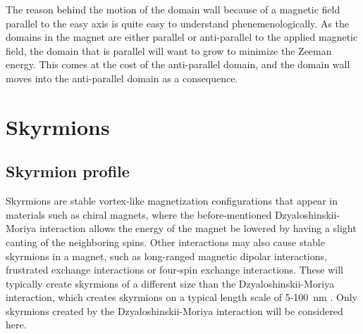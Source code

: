 \documentclass[12pt, a4paper, twoside, openright]{article}		%
\let\oldsection\section
\def\section{\cleardoublepage\oldsection}
\numberwithin{equation}{section}
\begin{document}
The reason behind the motion of the domain wall because of a magnetic field parallel to the easy axis is quite easy to understand phenemenologically. As the domains in the magnet are either parallel or anti-parallel to the applied magnetic field, the domain that is parallel will want to grow to minimize the Zeeman energy. This comes at the cost of the anti-parallel domain, and the domain wall moves into the anti-parallel domain as a consequence.

\section{Skyrmions} \label{sec:Skyrmions}
\subsection{Skyrmion profile} \label{sec:SkyrmionProfile}
Skyrmions are stable vortex-like magnetization configurations that appear in materials such as chiral magnets, where the before-mentioned Dzyaloshinskii-Moriya interaction allows the energy of the magnet be lowered by having a slight canting of the neighboring spins. Other interactions may also cause stable skyrmions in a magnet, such as long-ranged magnetic dipolar interactions, frustrated exchange interactions or four-spin exchange interactions. These will typically create skyrmions of a different size than the Dzyaloshinskii-Moriya interaction, which creates skyrmions on a typical length scale of 5-\SI{100}{nm} \cite{Nagaosa2013}. Only skyrmions created by the Dzyaloshinskii-Moriya interaction will be considered here.
\end{document}
